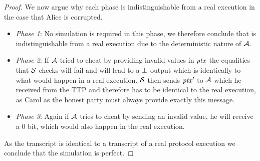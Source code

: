 \begin{proof}
    We now argue why each phase is indistinguishable from a real execution in the case that Alice is corrupted.

    \begin{itemize}
        \item \textit{Phase 1}: No simulation is required in this phase, we therefore conclude that is indistinguishable from a real execution due to the deterministic nature of $\mathcal{A}$.
        \item \textit{Phase 2}: If $\mathcal{A}$ tried to cheat by providing invalid values in $\mathit{ptx}$ the equalities that $\mathcal{S}$ checks will fail and will lead to a $\bot$ output which is identically to what would happen in a real execution.
        $\mathcal{S}$ then sends ${\mathit{ptx}}'$ to $\mathcal{A}$ which he received from the TTP and therefore has to be identical to the real execution, as Carol as the honest party must always provide exactly this message.
        \item \textit{Phase 3}: Again if $\mathcal{A}$ tries to cheat by sending an invalid value, he will receive a 0 bit, which would also happen in the real execution.
    \end{itemize}

    As the transcript is identical to a transcript of a real protocol execution we conclude that the simulation is perfect.


\end{proof}
